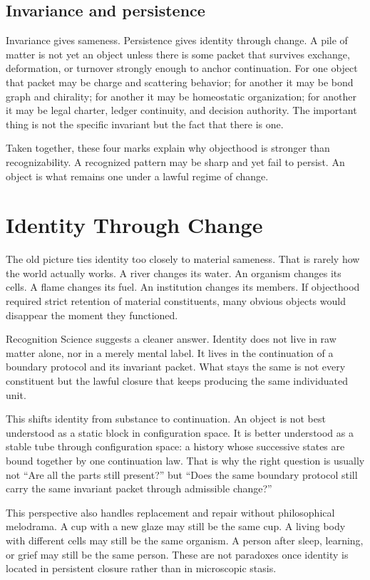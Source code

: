 \documentclass[11pt]{article}
\begin{document}
\subsection*{Invariance and persistence}
Invariance gives sameness.
Persistence gives identity through change.
A pile of matter is not yet an object unless there is some packet that survives exchange, deformation, or turnover strongly enough to anchor continuation.
For one object that packet may be charge and scattering behavior; for another it may be bond graph and chirality; for another it may be homeostatic organization; for another it may be legal charter, ledger continuity, and decision authority.
The important thing is not the specific invariant but the fact that there is one.

Taken together, these four marks explain why objecthood is stronger than recognizability.
A recognized pattern may be sharp and yet fail to persist.
An object is what remains one under a lawful regime of change.

\section{Identity Through Change}

The old picture ties identity too closely to material sameness.
That is rarely how the world actually works.
A river changes its water.
An organism changes its cells.
A flame changes its fuel.
An institution changes its members.
If objecthood required strict retention of material constituents, many obvious objects would disappear the moment they functioned.

Recognition Science suggests a cleaner answer.
Identity does not live in raw matter alone, nor in a merely mental label.
It lives in the continuation of a boundary protocol and its invariant packet.
What stays the same is not every constituent but the lawful closure that keeps producing the same individuated unit.

This shifts identity from substance to continuation.
An object is not best understood as a static block in configuration space.
It is better understood as a stable tube through configuration space: a history whose successive states are bound together by one continuation law.
That is why the right question is usually not ``Are all the parts still present?'' but ``Does the same boundary protocol still carry the same invariant packet through admissible change?''

This perspective also handles replacement and repair without philosophical melodrama.
A cup with a new glaze may still be the same cup.
A living body with different cells may still be the same organism.
A person after sleep, learning, or grief may still be the same person.
These are not paradoxes once identity is located in persistent closure rather than in microscopic stasis.
\end{document}
